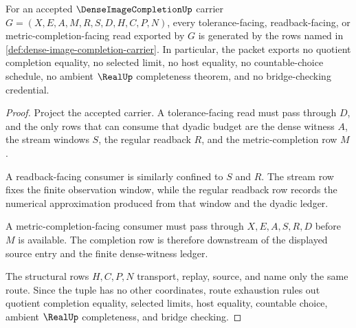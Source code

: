 \begin{theorem}
\label{thm:dense-image-completion-ledger-exhaustion}
For an accepted $\DenseImageCompletionUp$ carrier $G=(X,E,A,M,R,S,D,H,C,P,N)$, every tolerance-facing, readback-facing, or metric-completion-facing read exported by $G$ is generated by the rows named in \autoref{def:dense-image-completion-carrier}. In particular, the packet exports no quotient completion equality, no selected limit, no host equality, no countable-choice schedule, no ambient $\RealUp$ completeness theorem, and no bridge-checking credential.
\end{theorem}
\begin{proof}
Project the accepted carrier. A tolerance-facing read must pass through $D$, and the only rows that can consume that dyadic budget are the dense witness $A$, the stream windows $S$, the regular readback $R$, and the metric-completion row $M$.

A readback-facing consumer is similarly confined to $S$ and $R$. The stream row fixes the finite observation window, while the regular readback row records the numerical approximation produced from that window and the dyadic ledger.

A metric-completion-facing consumer must pass through $X,E,A,S,R,D$ before $M$ is available. The completion row is therefore downstream of the displayed source entry and the finite dense-witness ledger.

The structural rows $H,C,P,N$ transport, replay, source, and name only the same route. Since the tuple has no other coordinates, route exhaustion rules out quotient completion equality, selected limits, host equality, countable choice, ambient $\RealUp$ completeness, and bridge checking.
\end{proof}


